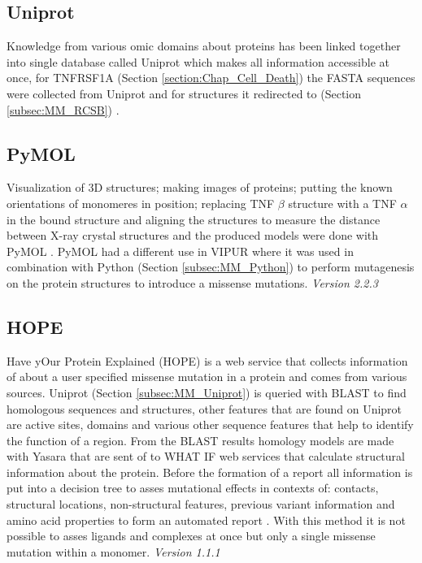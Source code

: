 \subsection{Uniprot}
Knowledge from various omic domains about proteins has been linked together into single database called Uniprot which makes all information accessible at once, for TNFRSF1A (Section \ref{section:Chap_Cell_Death}) the FASTA sequences were collected from Uniprot and for structures it redirected to (Section \ref{subsec:MM_RCSB}) \cite{the_uniprot_consortium_uniprot:_2015}.
\label{subsec:MM_Uniprot}

\subsection{PyMOL}
Visualization of 3D structures; making images of proteins; putting the known orientations of monomeres in position; replacing TNF $\beta$ structure with a TNF $\alpha$ in the bound structure and aligning the structures to measure the distance between X-ray crystal structures and the produced models were done with PyMOL \cite{schrodinger_pymol_nodate}. PyMOL had a different use in VIPUR where it was used in combination with Python (Section \ref{subsec:MM_Python}) to perform mutagenesis on the protein structures to introduce a missense mutations.
\label{subsec:MM_PyMOL}
\newline
\textit{Version 2.2.3}

\subsection{HOPE}
Have yOur Protein Explained (HOPE) is a web service that collects information of about a user specified missense mutation in a protein and comes from various sources. Uniprot (Section \ref{subsec:MM_Uniprot}) is queried with BLAST to find homologous sequences and structures, other features that are found on Uniprot are active sites, domains and various other sequence features that help to identify the function of a region. From the BLAST results homology models are made with Yasara that are sent of to WHAT IF web services that calculate structural information about the protein. Before the formation of a report all information is put into a decision tree to asses mutational effects in contexts of: contacts, structural locations, non-structural features, previous variant information and amino acid properties to form an automated report \cite{venselaar_protein_2010,cmbi_hope_nodate,cmbi_hope_nodate-1,cmbi_hope_nodate-2}.
With this method it is not possible to asses ligands and complexes at once but only a single missense mutation within a monomer.
\label{subsec:MM_HOPE}
\textit{Version 1.1.1}

